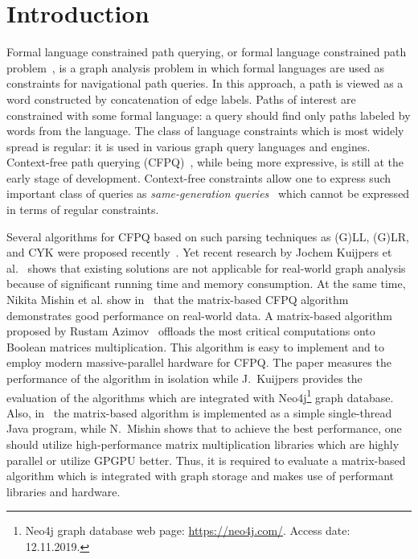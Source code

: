 \section{Introduction}

Formal language constrained path querying, or formal language constrained path problem~\cite{barrett2000formal}, is a graph analysis problem in which formal languages are used as constraints for navigational path queries.
In this approach, a path is viewed as a word constructed by concatenation of edge labels.
Paths of interest are constrained with some formal language: a query should find only paths labeled by words from the language.
The class of language constraints which is most widely spread is regular: it is used in various graph query languages and engines.
Context-free path querying (CFPQ)~\cite{Yannakakis}, while being more expressive, is still at the early stage of development.
Context-free constraints allow one to express such important class of queries as \textit{same-generation queries}~\cite{FndDB} which cannot be expressed in terms of regular constraints.

Several algorithms for CFPQ based on such parsing techniques as (G)LL, (G)LR, and CYK were proposed recently~\cite{bradford2007quickest,ward2008distributed,bradford2016fast,hellingsPathQuerying,Grigorev:2017:CPQ:3166094.3166104,Verbitskaia:2018:PCC:3241653.3241655,RDF,10.1007/978-3-319-91662-0_17,Medeiros:2018:EEC:3167132.3167265}.
Yet recent research by Jochem Kuijpers et al.~\cite{Kuijpers:2019:ESC:3335783.3335791} shows that existing solutions are not applicable for real-world graph analysis because of significant running time and memory consumption.
At the same time, Nikita Mishin et al. show in~\cite{Mishin:2019:ECP:3327964.3328503} that the matrix-based CFPQ algorithm demonstrates good performance on real-world data.
A matrix-based algorithm proposed by Rustam Azimov~\cite{Azimov:2018:CPQ:3210259.3210264} offloads the most critical computations onto Boolean matrices multiplication.
This algorithm is easy to implement and to employ modern massive-parallel hardware for CFPQ.
The paper measures the performance of the algorithm in isolation while J.~Kuijpers provides the evaluation of the algorithms which are integrated with Neo4j\footnote{Neo4j graph database web page: \url{https://neo4j.com/}. Access date: 12.11.2019.} graph database.
Also, in~\cite{Kuijpers:2019:ESC:3335783.3335791} the matrix-based algorithm is implemented as a simple single-thread Java program, while N.~Mishin shows that to achieve the best performance, one should utilize high-performance matrix multiplication libraries which are highly parallel or utilize GPGPU better.
Thus, it is required to evaluate a matrix-based algorithm which is integrated with graph storage and makes use of performant libraries and hardware.

